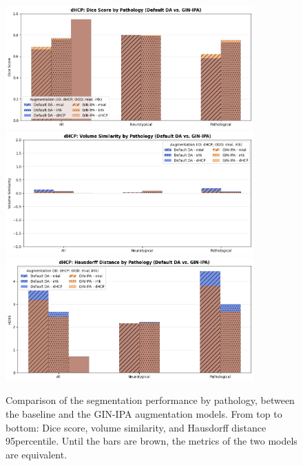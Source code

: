 \begin{figure}[htbp]
  \centering
  \includegraphics[width=0.85\textwidth]{figures/1_pathology_DC.png} \\
  \vspace{10pt}
  \includegraphics[width=0.85\textwidth]{figures/1_pathology_VS.png} \\
  \vspace{10pt}
  \includegraphics[width=0.85\textwidth]{figures/1_pathology_HD.png}
  \caption{Comparison of the segmentation performance by pathology, between the baseline and the GIN-IPA augmentation models. From top to bottom: Dice score, volume similarity, and Hausdorff distance 95\th percentile. Until the bars are brown, the metrics of the two models are equivalent.}
  \label{fig:pathology_summary_1}
\end{figure}

